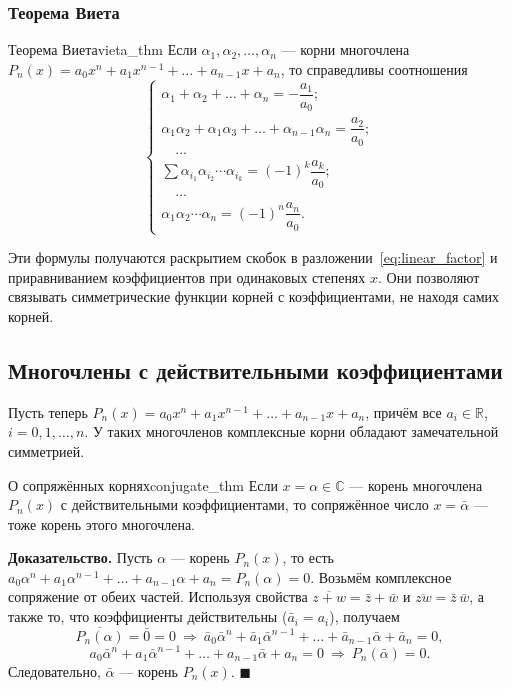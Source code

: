 \documentclass[12pt,a4paper]{article}
\newenvironment{myproof}{\noindent\textbf{Доказательство.}}{\hfill$\blacksquare$}
\begin{document}
\subsubsection*{Теорема Виета}

\begin{theorem}{Теорема Виета}{vieta_thm}
Если $\alpha_1, \alpha_2, \dots, \alpha_n$ — корни многочлена
$P_n(x) = a_0 x^n + a_1 x^{n-1} + \dots + a_{n-1} x + a_n$, то
справедливы соотношения
\[
\begin{cases}
  \alpha_1 + \alpha_2 + \dots + \alpha_n
  = -\dfrac{a_1}{a_0}; \\[2mm]
  \alpha_1\alpha_2 + \alpha_1\alpha_3 + \dots + \alpha_{n-1}\alpha_n
  = \dfrac{a_2}{a_0}; \\[2mm]
  \quad\dots \\[1mm]
  \displaystyle\sum \alpha_{i_1}\alpha_{i_2}\cdots\alpha_{i_k}
  = (-1)^k \dfrac{a_k}{a_0}; \\[2mm]
  \quad\dots \\[1mm]
  \alpha_1\alpha_2 \cdots \alpha_n
  = (-1)^n \dfrac{a_n}{a_0}.
\end{cases}
\]
\end{theorem}

\noindent Эти формулы получаются раскрытием скобок в
разложении~\eqref{eq:linear_factor} и приравниванием коэффициентов при
одинаковых степенях $x$. Они позволяют связывать симметрические
функции корней с коэффициентами, не находя самих корней.

\subsection{Многочлены с действительными коэффициентами}

Пусть теперь $P_n(x) = a_0 x^n + a_1 x^{n-1} + \dots + a_{n-1} x + a_n$,
причём все $a_i \in \mathbb{R}$, $i = 0, 1, \dots, n$. У таких
многочленов комплексные корни обладают замечательной симметрией.

\begin{theorem}{О сопряжённых корнях}{conjugate_thm}
Если $x = \alpha \in \mathbb{C}$ — корень многочлена $P_n(x)$ с
действительными коэффициентами, то сопряжённое число
$x = \bar{\alpha}$ — тоже корень этого многочлена.
\end{theorem}

\begin{myproof}
Пусть $\alpha$ — корень $P_n(x)$, то есть
$a_0 \alpha^n + a_1 \alpha^{n-1} + \dots + a_{n-1}\alpha + a_n
= P_n(\alpha) = 0$.
Возьмём комплексное сопряжение от обеих частей. Используя свойства
$\overline{z + w} = \bar{z} + \bar{w}$ и
$\overline{zw} = \bar{z}\,\bar{w}$, а также то, что коэффициенты
действительны ($\bar{a}_i = a_i$), получаем
\[
\overline{P_n(\alpha)} = \bar{0} = 0
\ \Longrightarrow\
\bar a_0 \bar\alpha^{n} + \bar a_1 \bar\alpha^{n-1} + \dots
+ \bar a_{n-1}\bar\alpha + \bar a_n = 0,
\]
\[
a_0 \bar\alpha^{n} + a_1 \bar\alpha^{n-1} + \dots
+ a_{n-1}\bar\alpha + a_n = 0
\ \Longrightarrow\
P_n(\bar\alpha) = 0.
\]
Следовательно, $\bar\alpha$ — корень $P_n(x)$.
\end{myproof}
\end{document}
